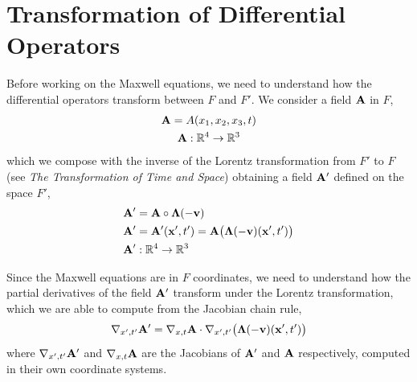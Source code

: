 \documentclass[12pt]{article}
\begin{document}
\section{Transformation of Differential Operators}

Before working on the Maxwell equations, we need to understand how the differential operators
transform between $F$ and $F'$. We consider a field $\vb{A}$ in $F$,
\begin{equation}
  \begin{gathered}
    \vb{A} = A(x_1, x_2, x_3, t) \\
    \vb{A}: \mathbb{R}^4 \to \mathbb{R}^3
  \end{gathered}
\end{equation}
which we compose with the inverse of the Lorentz transformation from $F'$ to $F$ (see
\textit{The Transformation of Time and Space}) obtaining a field $\vb{A}'$ defined on the
space $F'$,
\begin{align}
  \vb{A}' &= \vb{A} \circ \boldsymbol{\Lambda}(-\vb{v}) \\
  \vb{A}' &= \vb{A}'(\vb{x}', t') = \vb{A}\bigl(\boldsymbol{\Lambda}(-\vb{v})(\vb{x}', t')\bigr) \nonumber \\
  \vb{A}' &: \mathbb{R}^4 \to \mathbb{R}^3 \nonumber
\end{align}

Since the Maxwell equations are in $F$ coordinates, we need to understand how the partial
derivatives of the field $\vb{A}'$ transform under the Lorentz transformation, which we are
able to compute from the Jacobian chain rule,
\begin{equation}
  \nabla_{x',t'}\vb{A}' = \nabla_{x,t}\vb{A} \cdot \nabla_{x',t'}\bigl(\boldsymbol{\Lambda}(-\vb{v})(\vb{x}',t')\bigr)
\end{equation}
where $\nabla_{x',t'}\vb{A}'$ and $\nabla_{x,t}\vb{A}$ are the Jacobians of $\vb{A}'$ and
$\vb{A}$ respectively, computed in their own coordinate systems.
\end{document}
